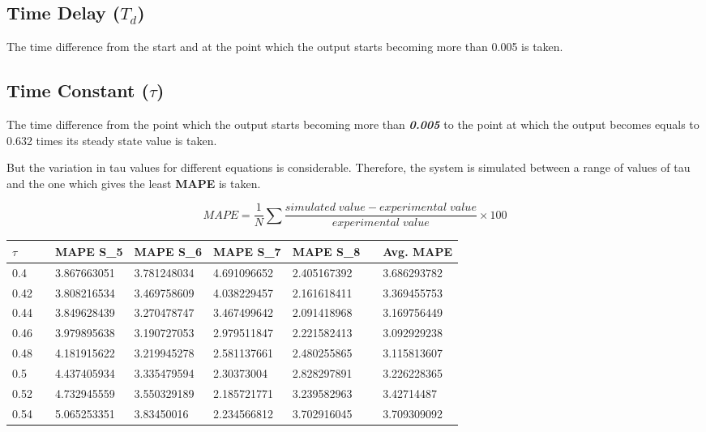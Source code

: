 \documentclass{article}
\begin{document}
\subsection{Time Delay ($T_d$)}
The time difference from the start and at the point which the output starts becoming more than 0.005 is taken.

\subsection{Time Constant ($\tau$)}
The time difference from the point which the output starts becoming more than \textbf{\textit{0.005}} to the point at which the output becomes equals to 0.632 times its steady state value is taken.

But the variation in tau values for different equations is considerable. Therefore, the system is simulated between a range of values of tau and the one which gives the least \textbf{MAPE} is taken.

\[MAPE = \frac{1}{N} \sum \frac{simulated \; value - experimental \; value}{experimental \; value} \times 100\]

\begin{table}[h]
\begin{center}
\begin{tabular}{|l|l|l|l|l|l|l|l|}
\hline
$\tau$  &  & MAPE S\_5   & MAPE S\_6   & MAPE S\_7   & MAPE S\_8   &  & Avg. MAPE   \\ \hline
    \hline
0.4  &  & 3.867663051 & 3.781248034 & 4.691096652 & 2.405167392 &  & 3.686293782 \\ \hline
0.42 &  & 3.808216534 & 3.469758609 & 4.038229457 & 2.161618411 &  & 3.369455753 \\ \hline
0.44 &  & 3.849628439 & 3.270478747 & 3.467499642 & 2.091418968 &  & 3.169756449 \\ \hline
0.46 &  & 3.979895638 & 3.190727053 & 2.979511847 & 2.221582413 &  & 3.092929238 \\ \hline
0.48 &  & 4.181915622 & 3.219945278 & 2.581137661 & 2.480255865 &  & 3.115813607 \\ \hline
0.5  &  & 4.437405934 & 3.335479594 & 2.30373004  & 2.828297891 &  & 3.226228365 \\ \hline
0.52 &  & 4.732945559 & 3.550329189 & 2.185721771 & 3.239582963 &  & 3.42714487  \\ \hline
0.54 &  & 5.065253351 & 3.83450016  & 2.234566812 & 3.702916045 &  & 3.709309092 \\ \hline

\end{tabular}
\end{center}
\end{table}
\end{document}
